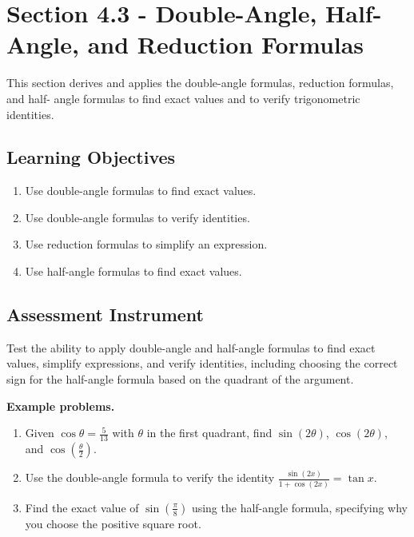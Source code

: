 \section{Section 4.3 - Double-Angle, Half-Angle, and Reduction Formulas}
\label{sec:sect-b254}

This section derives and applies the double-angle formulas, reduction formulas, and half-
angle formulas to find exact values and to verify trigonometric identities.

\subsection{Learning Objectives}
\label{ssec:lear-fe6e}

\begin{enumerate}
    \item Use double-angle formulas to find exact values.
    \item Use double-angle formulas to verify identities.
    \item Use reduction formulas to simplify an expression.
    \item Use half-angle formulas to find exact values.
\end{enumerate}

\subsection{Assessment Instrument}
\label{ssec:asse-3669}

Test the ability to apply double-angle and half-angle formulas to find exact values,
simplify expressions, and verify identities, including choosing the correct sign for the
half-angle formula based on the quadrant of the argument.

\textbf{Example problems.}
\begin{enumerate}
    \item Given $\cos\theta = \frac{5}{13}$ with $\theta$ in the first quadrant, find $\sin(2\theta)$, $\cos(2\theta)$, and $\cos\!\left(\frac{\theta}{2}\right)$.
    \item Use the double-angle formula to verify the identity $\frac{\sin(2x)}{1 + \cos(2x)} = \tan x$.
    \item Find the exact value of $\sin\!\left(\frac{\pi}{8}\right)$ using the half-angle formula, specifying why you choose the positive square root.
\end{enumerate}

